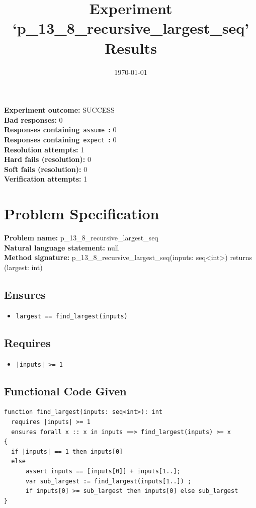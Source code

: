 \documentclass{article}
\begin{document}
\title{Experiment `p\_13\_8\_recursive\_largest\_seq' Results}
\author{\today}
\date{}
\maketitle
\textbf{Experiment outcome: }SUCCESS
\\\textbf{Bad responses: }0
\\\textbf{Responses containing}~\texttt{assume}~\textbf{: }0
\\\textbf{Responses containing}~\texttt{expect}~\textbf{: }0
\\\textbf{Resolution attempts: }1
\\\textbf{Hard fails (resolution): }0
\\\textbf{Soft fails (resolution): }0
\\\textbf{Verification attempts: }1
\section*{Problem Specification}
\textbf{Problem name: }p\_13\_8\_recursive\_largest\_seq
\\\textbf{Natural language statement: }null
\\\textbf{Method signature: }p\_13\_8\_recursive\_largest\_seq(inputs: seq<int>) returns (largest: int)
\subsection*{Ensures}
\begin{itemize}
\item \texttt{largest == find\_largest(inputs)}
\end{itemize}
\subsection*{Requires}
\begin{itemize}
\item \texttt{|inputs| >= 1}
\end{itemize}
\subsection*{Functional Code Given}
\begin{lstlisting}
function find_largest(inputs: seq<int>): int
  requires |inputs| >= 1
  ensures forall x :: x in inputs ==> find_largest(inputs) >= x
{
  if |inputs| == 1 then inputs[0]
  else 
      assert inputs == [inputs[0]] + inputs[1..];
      var sub_largest := find_largest(inputs[1..]) ;
      if inputs[0] >= sub_largest then inputs[0] else sub_largest
}
\end{lstlisting}
\clearpage
\end{document}
